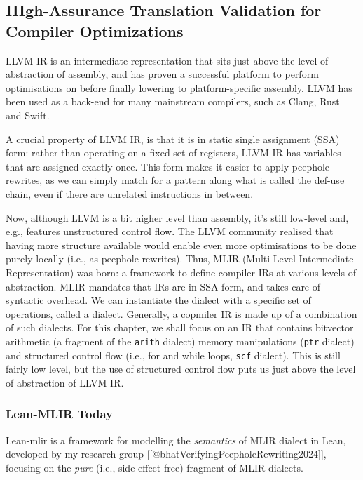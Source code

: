 \subsection{HIgh-Assurance Translation Validation for Compiler
Optimizations}\label{high-assurance-translation-validation-for-compiler-optimizations}

LLVM IR is an intermediate representation that sits just above the level
of abstraction of assembly, and has proven a successful platform to
perform optimisations on before finally lowering to platform-specific
assembly. LLVM has been used as a back-end for many mainstream
compilers, such as Clang, Rust and Swift.

A crucial property of LLVM IR, is that it is in static single assignment
(SSA) form: rather than operating on a fixed set of registers, LLVM IR
has variables that are assigned exactly once. This form makes it easier
to apply peephole rewrites, as we can simply match for a pattern along
what is called the def-use chain, even if there are unrelated
instructions in between.

Now, although LLVM is a bit higher level than assembly, it's still
low-level and, e.g., features unstructured control flow. The LLVM
community realised that having more structure available would enable
even more optimisations to be done purely locally (i.e., as peephole
rewrites). Thus, MLIR (Multi Level Intermediate Representation) was
born: a framework to define compiler IRs at various levels of
abstraction. MLIR mandates that IRs are in SSA form, and takes care of
syntactic overhead. We can instantiate the dialect with a specific set
of operations, called a dialect. Generally, a copmiler IR is made up of
a combination of such dialects. For this chapter, we shall focus on an
IR that contains bitvector arithmetic (a fragment of the \texttt{arith}
dialect) memory manipulations (\texttt{ptr} dialect) and structured
control flow (i.e., for and while loops, \texttt{scf} dialect). This is
still fairly low level, but the use of structured control flow puts us
just above the level of abstraction of LLVM IR.

\subsubsection{Lean-MLIR Today}\label{lean-mlir-today}

Lean-mlir is a framework for modelling the \emph{semantics} of MLIR
dialect in Lean, developed by my research group
{[}{[}@bhatVerifyingPeepholeRewriting2024{]}{]}, focusing on the
\emph{pure} (i.e., side-effect-free) fragment of MLIR dialects.

